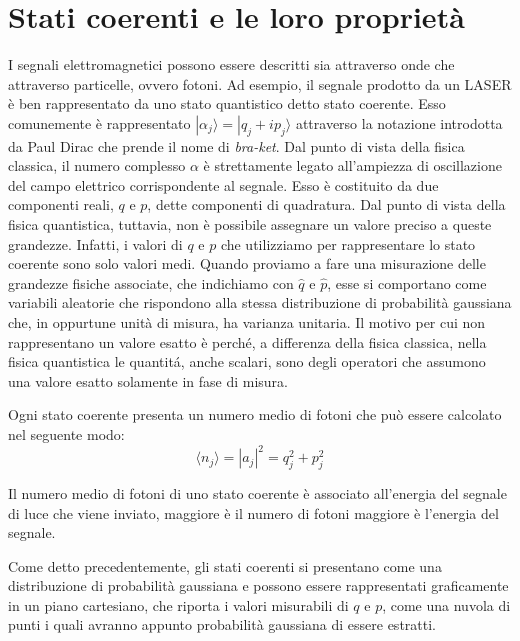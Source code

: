 \section{Stati coerenti e le loro propriet\`a}\label{se:sezione1-1}
I segnali elettromagnetici possono essere descritti sia attraverso onde che attraverso particelle, ovvero fotoni. Ad esempio, il segnale prodotto da un LASER è ben rappresentato da uno stato quantistico detto stato coerente. Esso comunemente \`e rappresentato $|\alpha_j \rangle = |q_j + ip_j \rangle $ attraverso la notazione introdotta da Paul Dirac che prende il nome di \textit{bra-ket}. Dal punto di vista della fisica classica, il numero complesso $\alpha$ è strettamente legato all'ampiezza di oscillazione del campo elettrico corrispondente al segnale. Esso è costituito da due componenti reali, $q$ e $p$, dette componenti di quadratura. Dal punto di vista della fisica quantistica, tuttavia, non è possibile assegnare un valore preciso a queste grandezze. Infatti, i valori di $q$ e $p$ che utilizziamo per rappresentare lo stato coerente sono solo valori medi. Quando proviamo a fare una misurazione delle grandezze fisiche associate, che indichiamo con $\hat q$ e $\hat p$, esse si comportano come variabili aleatorie che rispondono alla stessa distribuzione di probabilit\`a gaussiana che, in oppurtune unit\`a di misura, ha varianza unitaria. Il motivo per cui non rappresentano un valore esatto \`e perch\'e, a differenza della fisica classica, nella fisica quantistica le quantit\'a, anche scalari, sono degli operatori che assumono una valore esatto solamente in fase di misura.

Ogni stato coerente presenta un numero medio di fotoni che pu\`o essere calcolato nel seguente modo:
\begin{equation}
\langle n_j \rangle = |a_j|^2 = q_j^2 + p_j^2 
\end{equation}

Il numero medio di fotoni di uno stato coerente \`e associato all'energia del segnale di luce che viene inviato, maggiore \`e il numero di fotoni maggiore \`e l'energia del segnale.

Come detto precedentemente, gli stati coerenti si presentano come una distribuzione di probabilit\`a gaussiana e possono essere rappresentati graficamente in un piano cartesiano, che riporta i valori misurabili di $q$ e $p$, come una nuvola di punti i quali avranno appunto probabilit\`a gaussiana di essere estratti.


